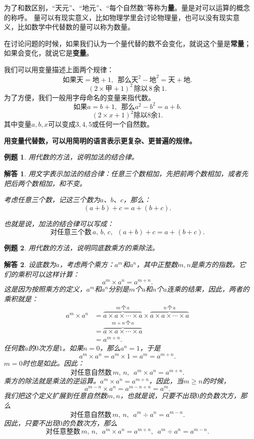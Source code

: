 \documentclass[12pt,UTF8]{ctexbook}
\newtheorem{et}{例题}[section]
\newtheorem*{so}{解答}
\begin{document}
为了和数区别，“天元”、“地元”、“每个自然数”等称为\textbf{量}。量是对可以运算的概念的称呼。
量可以有现实意义，比如物理学里会讨论物理量，也可以没有现实意义，比如数学中代替数的量可以称为数量。

在讨论问题的时候，如果我们认为一个量代替的数不会变化，就说这个量是\textbf{常量}；如果会变化，就说它是\textbf{变量}。

我们可以用变量描述上面两个规律：
$$ \mbox{如果天} = \mbox{地}+1, \,\,\,\mbox{那么}\mbox{天}^2 - \mbox{地}^2 = \mbox{天} + \mbox{地}. $$
$$  (2\times \mbox{甲} + 1)^2 \,\mbox{除以} \,8\,\mbox{余}\,1.$$
为了方便，我们一般用字母命名的变量来指代数。
$$ \mbox{如果} a = b+1, \,\,\,\mbox{那么} a^2 - b^2 = a + b. $$
$$  (2\times x + 1)^2 \mbox{除以} 8\mbox{余} 1.$$
其中变量$a,b,x$可以变成$3,4,5$或任何一个自然数。

\textbf{用变量代替数，可以用简明的语言表示更复杂、更普遍的规律。}

\begin{et}
    用代数的方法，说明加法的结合律。
\end{et}

\begin{so}
    用文字表示加法的结合律：任意三个数相加，先把前两个数相加，或者先把后两个数相加，和不变。

    考虑任意三个数，记这三个数为$a$、$b$、$c$，那么：
    $$ (a + b) + c = a + (b + c).$$

    也就是说，加法的结合律可以写成：
    $$ \mbox{对任意三个数}\,a,\,b,\,c, \,\,\, (a + b) + c = a + (b + c).$$

\end{so}

\begin{et}
    用代数的方法，说明同底数乘方的乘除法。
\end{et}

\begin{so}
    设底数为$a$，考虑两个乘方：$a^m$和$a^n$，其中正整数$m,n$是乘方的指数。它们的乘积可以这样计算：
    $$ a^m \times a^n = a^{m+n}. $$
    这是因为按照乘方的定义，$a^m$和$a^n$分别是$m$个$a$和$n$个$a$连乘的结果，因此，两者的乘积就是：
    \begin{align*}
        a^m \times a^n &= \overbrace{a\times a\times \cdots \times a}^{m\,\text{个}\,a} \times \overbrace{a\times a\times \cdots \times a}^{n\,\text{个}\,a} \\
        &= \overbrace{a\times a\times \cdots \times a}^{m+n\,\text{个}\,a} \\
        &= a^{m+n}.
    \end{align*}
    任何数$a$的$0$次方是$1$。如果$n=0$，那么$a^n=1$，于是
    $$ a^m \times a^n = a^{m}\times 1 = a^m = a^{m+n}. $$
    $m=0$时也是如此。因此：
    $$ \mbox{对任意自然数}\,m,\, n, \,\,\, a^m \times a^n = a^{m+n}. $$
    乘方的除法就是乘法的逆运算。$ a^m \times a^n = a^{m+n}$，因此，当$m\geqslant n$的时候，
    $$ a^{m-n} \times a^n = a^{m-n+n} = a^m. $$
    我们把这个定义扩展到任意自然数$m,n$，也就是说，只要不出现$0$的负数次方，那么
    $$  \mbox{对任意自然数}\,m,\, n, \,\,\, a^m \div a^n = a^{m-n}. $$
    因此，只要不出现$0$的负数次方，那么
    $$  \mbox{对任意整数}\,m,\, n, \,\,\, a^m \times a^n = a^{m+n}, \,\,\, a^m \div a^n = a^{m-n}. $$
\end{so}
\end{document}
